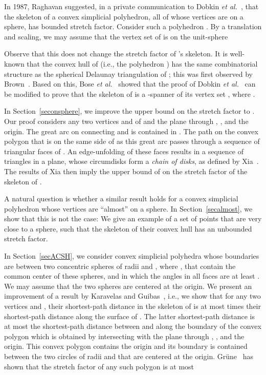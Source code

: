\documentclass[12pt]{article}
\begin{document}
In 1987, Raghavan suggested, in a private communication to
Dobkin \emph{et al.}~\cite{dfs-dgaag-90}, that the skeleton of a convex 
simplicial polyhedron, all of whose vertices are on a sphere, has 
bounded stretch factor. Consider such a polyhedron . By a 
translation and scaling, we may assume that the vertex set  of  
is on the unit-sphere 
 
Observe that this does not change the stretch factor of 's skeleton.  
It is well-known that the convex hull of  (i.e., the polyhedron ) 
has the same combinatorial structure as the spherical Delaunay 
triangulation of ; this was first  observed by 
Brown~\cite{b-gtfga-80}. Based on this, 
Bose \emph{et al.}~\cite{bps-chpss-14} showed that the proof of   
Dobkin \emph{et al.}~\cite{dfs-dgaag-90} can be modified to prove that 
the skeleton of  is a -spanner of its vertex set , where 
.  

In Section~\ref{seconsphere}, we improve the upper bound on the stretch 
factor to . Our proof considers any two 
vertices  and  of  and the plane  through , , 
and the origin. The great arc on  connecting  and  is 
contained in . The path on the convex polygon 
 that is on the same side of  as this 
great arc passes through a sequence of triangular faces of . 
An edge-unfolding of these faces results in a sequence of triangles in 
a plane, whose circumdisks form a \emph{chain of disks}, as defined 
by Xia~\cite{x-sfdtl-13}. The results of Xia then imply the upper 
bound of  on the stretch factor of the skeleton of . 

A natural question is whether a similar result holds for a convex 
simplicial polyhedron whose vertices are ``almost'' on a sphere. 
In Section~\ref{secalmost}, we show that this is not the case: We give 
an example of a set of points that are very close to a sphere, such that 
the skeleton of their convex hull has an unbounded stretch factor. 

In Section~\ref{secACSH}, we consider convex simplicial polyhedra  
whose boundaries are between two concentric spheres of radii  and 
, where , that contain the common center of these spheres, 
and in which the angles in all faces are at least . 
We may assume that the two spheres are centered at the origin. We 
present an improvement of a result by 
Karavelas and Guibas~\cite{kg-skgsa-01}, i.e., we show that for any two 
vertices  and , their shortest-path distance in the skeleton of 
 is at most  times their shortest-path 
distance along the surface of . The latter shortest-path distance is 
at most the shortest-path distance between  and  along the 
boundary of the convex polygon  which is obtained by 
intersecting  with the plane through , , and the origin. This 
convex polygon contains the origin and its boundary is contained 
between the two circles of radii  and  that are centered at the 
origin. Gr{\"u}ne~\cite[Lemma~2.40]{g-gdhd-06} has 
shown that the stretch factor of any such polygon is at most 
 
\end{document}
